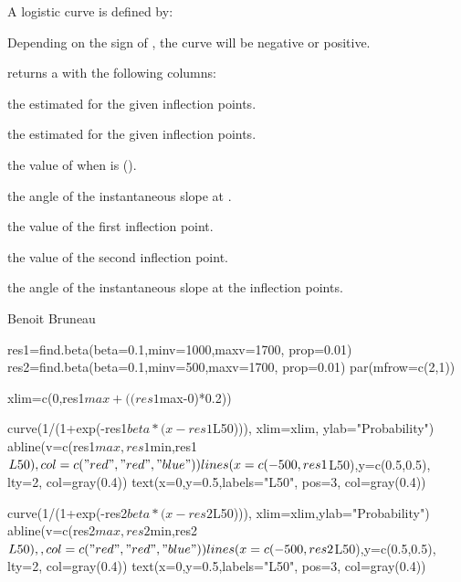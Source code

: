 \documentclass[a4paper]{book}
\begin{document}
%
\begin{Details}\relax
A logistic curve is defined by:


Depending on the sign of \eqn{\beta}{}, the curve will be negative or positive.
\end{Details}
%
\begin{Value}
 returns a  with the following columns:

\begin{ldescription}
\item[\code{beta}] the estimated \eqn{\beta}{} for the given inflection points.
\item[\code{alpha}] the estimated \eqn{\alpha}{} for the given inflection points.
\item[\code{x50}] the value of  when  is  ().
\item[\code{angle.x50}] the angle of the instantaneous slope at .
\item[\code{min}] the value of the first inflection point.
\item[\code{max}] the value of the second inflection point.
\item[\code{angle.infl}] the angle of the instantaneous slope at the inflection points.
\end{ldescription}
\end{Value}
%
\begin{Author}\relax
Benoit Bruneau
\end{Author}
%
\begin{SeeAlso}\relax
{}
\end{SeeAlso}
%
\begin{Examples}
\begin{ExampleCode}
res1=find.beta(beta=0.1,minv=1000,maxv=1700, prop=0.01)
res2=find.beta(beta=0.1,minv=500,maxv=1700, prop=0.01)
par(mfrow=c(2,1))

xlim=c(0,res1$max+((res1$max-0)*0.2))

curve(1/(1+exp(-res1$beta*(x-res1$L50))), xlim=xlim, ylab="Probability")
abline(v=c(res1$max,res1$min,res1$L50), col=c("red","red","blue"))
lines(x=c(-500,res1$L50),y=c(0.5,0.5), lty=2, col=gray(0.4))
text(x=0,y=0.5,labels="L50", pos=3, col=gray(0.4))

curve(1/(1+exp(-res2$beta*(x-res2$L50))), xlim=xlim,ylab="Probability")
abline(v=c(res2$max,res2$min,res2$L50),, col=c("red","red","blue"))
lines(x=c(-500,res2$L50),y=c(0.5,0.5), lty=2, col=gray(0.4))
text(x=0,y=0.5,labels="L50", pos=3, col=gray(0.4))
\end{ExampleCode}
\end{Examples}
\end{document}
